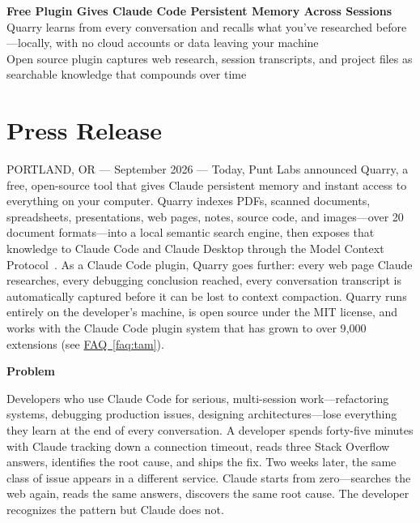 \documentclass[11pt,letterpaper]{article}
\newcommand{\prsection}[1]{%
  \vspace{1em}%
  {\large\bfseries\color{SectionBlue}#1}%
  \vspace{0.3em}\par%
}
\newcommand{\faqref}[1]{\hyperref[#1]{FAQ~\ref*{#1}}}
\begin{document}
\begin{center}
  {\LARGE\bfseries\color{SectionBlue}
    Free Plugin Gives Claude Code Persistent Memory Across Sessions} \\[0.8em]
  {\large\color{AccentGray}
    Quarry learns from every conversation and recalls what you've researched before---locally, with no cloud accounts or data leaving your machine} \\[0.3em]
  {\large\color{AccentGray}
    Open source plugin captures web research, session transcripts, and project files as searchable knowledge that compounds over time}
\end{center}

\vspace{0.5em}


\section*{Press Release}

PORTLAND, OR --- September 2026 --- Today, Punt Labs announced Quarry, a free,
open-source tool that gives Claude persistent memory and instant access to
everything on your computer. Quarry indexes PDFs, scanned documents,
spreadsheets, presentations, web pages, notes, source code, and images---over
20 document formats---into a local semantic search engine, then exposes that
knowledge to Claude Code and Claude Desktop through the Model Context
Protocol~\cite{aitoolanalysis2026claudeplugins}. As a Claude Code plugin,
Quarry goes further: every web page Claude researches, every debugging
conclusion reached, every conversation transcript is automatically captured
before it can be lost to context compaction. Quarry runs entirely on the
developer's machine, is open source under the MIT license, and works with the
Claude Code plugin system that has grown to over 9{,}000 extensions
(see \faqref{faq:tam}).

\prsection{Problem}

Developers who use Claude Code for serious, multi-session work---refactoring
systems, debugging production issues, designing architectures---lose everything
they learn at the end of every conversation. A developer spends forty-five
minutes with Claude tracking down a connection timeout, reads three Stack
Overflow answers, identifies the root cause, and ships the fix. Two weeks later,
the same class of issue appears in a different service. Claude starts from
zero---searches the web again, reads the same answers, discovers the same root
cause. The developer recognizes the pattern but Claude does not.
\end{document}
